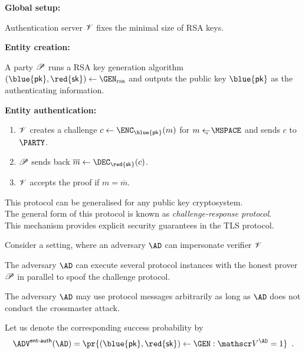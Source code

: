 \documentclass[landscape,footrule]{foils}
\newcommand{\lastline}{\vspace*{-2ex}}
\newcommand{\spreadappart}{\vspace*{\fill}}
\renewcommand{\SK}{{\red{\mathsf{sk}}}}
\renewcommand{\PK}{{\blue{\mathsf{pk}}}}
\begin{document}

\textbf{Global setup:}  \\
\hspace*{0.03\linewidth}
\begin{minipage}[t]{0.97\linewidth}
  Authentication server $\mathscr{V}$ fixes the minimal size of RSA keys. 
\end{minipage}


\textbf{Entity creation:}  \\
\hspace*{0.03\linewidth}
\begin{minipage}[t]{0.97\linewidth}
  A party $\mathscr{P}$ runs a RSA key generation algorithm
  $(\PK,\SK)\gets\GEN_{\mathrm{rsa}}$ and outputs the public key $\PK$
  as the authenticating information.
\end{minipage}

\textbf{Entity authentication:}  \\
\hspace*{0.03\linewidth}
\begin{minipage}[t]{0.97\linewidth}
  \begin{enumerate}
  \item $\mathscr{V}$ creates a challenge $c\gets\ENC_\PK(m)$ for
    $m\getsu\MSPACE$ and sends $c$ to $\PARTY$.
  \item $\mathscr{P}$ sends back $\overline{m}\gets\DEC_\SK(c)$.
  \item $\mathscr{V}$ accepts the proof if $m=\overline{m}$.
  \end{enumerate}
\end{minipage}
\bigskip
\spreadappart

This protocol can be generalised for any public key cryptosystem.\\
The general form of this protocol is known as
\emph{challenge-response protocol}.\\
This mechanism provides explicit security guarantees in the TLS protocol.
\lastline



Consider a setting, where an adversary $\AD$ can impersonate verifier $\mathscr{V}$
\begin{triangles}
\item The adversary $\AD$ can execute several protocol instances with
  the honest prover $\mathscr{P}$ in parallel to spoof the challenge
  protocol.
\item The adversary $\AD$ may use protocol messages arbitrarily as
  long as $\AD$ does not conduct the crossmaster attack.
\end{triangles}
Let us denote the corresponding success probability by
\begin{align*}
\advEAUTHXX{}{\AD}=\pr{\smash{(\PK,\SK)\gets\GEN: \VERIFIER^{\AD}=1}}\enspace.
\end{align*}
\end{document}
